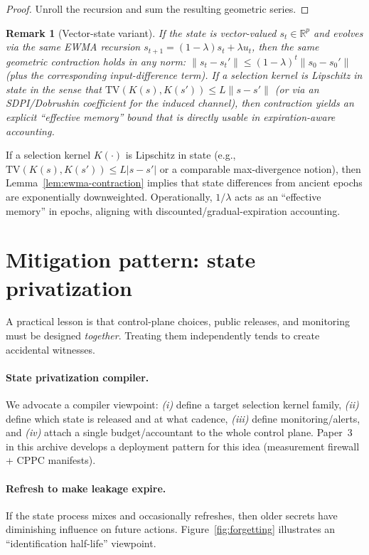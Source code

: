 \documentclass[11pt]{article}
\newtheorem{remark}{Remark}
\newcommand{\TV}{\mathrm{TV}}
\begin{document}
\begin{proof}
Unroll the recursion and sum the resulting geometric series.
\end{proof}

\begin{remark}[Vector-state variant]
If the state is vector-valued $s_t\in\mathbb{R}^p$ and evolves via the same EWMA recursion $s_{t+1}=(1-\lambda)s_t+\lambda u_t$, then the same geometric contraction holds in any norm:
$\|s_t-s_t'\|\le (1-\lambda)^t\|s_0-s_0'\|$ (plus the corresponding input-difference term).
If a selection kernel is Lipschitz in state in the sense that $\TV(K(s),K(s'))\le L\|s-s'\|$ (or via an SDPI/Dobrushin coefficient for the induced channel), then contraction yields an explicit ``effective memory'' bound that is directly usable in expiration-aware accounting.
\end{remark}


If a selection kernel $K(\cdot)$ is Lipschitz in state (e.g., $\TV(K(s),K(s'))\le L|s-s'|$ or a comparable max-divergence notion), then Lemma~\ref{lem:ewma-contraction} implies that state differences from ancient epochs are exponentially downweighted.
Operationally, $1/\lambda$ acts as an ``effective memory'' in epochs, aligning with discounted/gradual-expiration accounting.


\section{Mitigation pattern: state privatization}
\label{sec:mitigations}

A practical lesson is that control-plane choices, public releases, and monitoring must be designed \emph{together}.
Treating them independently tends to create accidental witnesses.

\paragraph{State privatization compiler.}
We advocate a compiler viewpoint:
\emph{(i)} define a target selection kernel family, \emph{(ii)} define which state is released and at what cadence,
\emph{(iii)} define monitoring/alerts, and \emph{(iv)} attach a single budget/accountant to the whole control plane.
Paper~3 in this archive develops a deployment pattern for this idea (measurement firewall + CPPC manifests).

\paragraph{Refresh to make leakage expire.}
If the state process mixes and occasionally refreshes, then older secrets have diminishing influence on future actions.
Figure~\ref{fig:forgetting} illustrates an ``identification half-life'' viewpoint.
\end{document}
